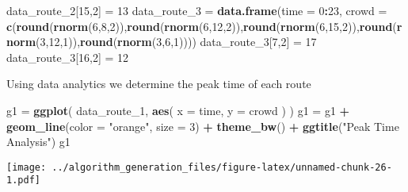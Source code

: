\documentclass[
]{article}
\newenvironment{Shaded}{\begin{snugshade}}{\end{snugshade}}
\newcommand{\DataTypeTok}[1]{\textcolor[rgb]{0.13,0.29,0.53}{#1}}
\newcommand{\DecValTok}[1]{\textcolor[rgb]{0.00,0.00,0.81}{#1}}
\newcommand{\KeywordTok}[1]{\textcolor[rgb]{0.13,0.29,0.53}{\textbf{#1}}}
\newcommand{\NormalTok}[1]{#1}
\newcommand{\OperatorTok}[1]{\textcolor[rgb]{0.81,0.36,0.00}{\textbf{#1}}}
\newcommand{\StringTok}[1]{\textcolor[rgb]{0.31,0.60,0.02}{#1}}
\begin{document}
\begin{Shaded}
\begin{Highlighting}[]
\NormalTok{data_route_}\DecValTok{2}\NormalTok{[}\DecValTok{15}\NormalTok{,}\DecValTok{2}\NormalTok{] =}\StringTok{ }\DecValTok{13}
\NormalTok{data_route_}\DecValTok{3}\NormalTok{ =}\StringTok{ }\KeywordTok{data.frame}\NormalTok{(}\DataTypeTok{time =} \DecValTok{0}\OperatorTok{:}\DecValTok{23}\NormalTok{, }\DataTypeTok{crowd =} \KeywordTok{c}\NormalTok{(}\KeywordTok{round}\NormalTok{(}\KeywordTok{rnorm}\NormalTok{(}\DecValTok{6}\NormalTok{,}\DecValTok{8}\NormalTok{,}\DecValTok{2}\NormalTok{)),}\KeywordTok{round}\NormalTok{(}\KeywordTok{rnorm}\NormalTok{(}\DecValTok{6}\NormalTok{,}\DecValTok{12}\NormalTok{,}\DecValTok{2}\NormalTok{)),}\KeywordTok{round}\NormalTok{(}\KeywordTok{rnorm}\NormalTok{(}\DecValTok{6}\NormalTok{,}\DecValTok{15}\NormalTok{,}\DecValTok{2}\NormalTok{)),}\KeywordTok{round}\NormalTok{(}\KeywordTok{rnorm}\NormalTok{(}\DecValTok{3}\NormalTok{,}\DecValTok{12}\NormalTok{,}\DecValTok{1}\NormalTok{)),}\KeywordTok{round}\NormalTok{(}\KeywordTok{rnorm}\NormalTok{(}\DecValTok{3}\NormalTok{,}\DecValTok{6}\NormalTok{,}\DecValTok{1}\NormalTok{))))}
\NormalTok{data_route_}\DecValTok{3}\NormalTok{[}\DecValTok{7}\NormalTok{,}\DecValTok{2}\NormalTok{] =}\StringTok{ }\DecValTok{17}
\NormalTok{data_route_}\DecValTok{3}\NormalTok{[}\DecValTok{16}\NormalTok{,}\DecValTok{2}\NormalTok{] =}\StringTok{ }\DecValTok{12}
\end{Highlighting}
\end{Shaded}

Using data analytics we determine the peak time of each route

\begin{Shaded}
\begin{Highlighting}[]
\NormalTok{g1 =}\StringTok{ }\KeywordTok{ggplot}\NormalTok{(}
\NormalTok{  data_route_}\DecValTok{1}\NormalTok{,}
      \KeywordTok{aes}\NormalTok{(}
        \DataTypeTok{x =}\NormalTok{ time,}
        \DataTypeTok{y =}\NormalTok{ crowd}
\NormalTok{      )}
\NormalTok{) }
\NormalTok{g1 =}\StringTok{ }\NormalTok{g1 }\OperatorTok{+}\StringTok{ }\KeywordTok{geom_line}\NormalTok{(}\DataTypeTok{color =} \StringTok{"orange"}\NormalTok{, }\DataTypeTok{size =} \DecValTok{3}\NormalTok{) }\OperatorTok{+}\StringTok{ }\KeywordTok{theme_bw}\NormalTok{() }\OperatorTok{+}\StringTok{ }\KeywordTok{ggtitle}\NormalTok{(}\StringTok{"Peak Time Analysis"}\NormalTok{)}
\NormalTok{g1}
\end{Highlighting}
\end{Shaded}

\texttt{[image: ../algorithm\_generation\_files/figure-latex/unnamed-chunk-26-1.pdf]}
\end{document}
